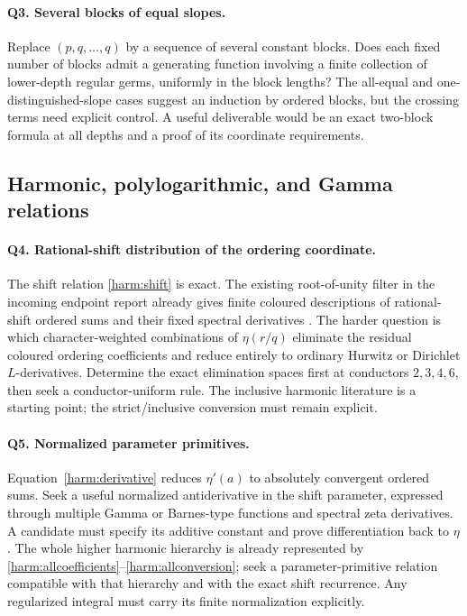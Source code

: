 \documentclass[11pt,letterpaper]{article}
\numberwithin{equation}{section}
\theoremstyle{definition}
\theoremstyle{remark}
\begin{document}
\paragraph{Q3. Several blocks of equal slopes.}
Replace $(p,q,\ldots,q)$ by a sequence of several constant blocks.
Does each fixed number of blocks admit a generating function involving
a finite collection of lower-depth regular germs, uniformly in the
block lengths? The all-equal and one-distinguished-slope cases suggest
an induction by ordered blocks, but the crossing terms need explicit
control. A useful deliverable would be an exact two-block formula at
all depths and a proof of its coordinate requirements.

\subsection{Harmonic, polylogarithmic, and Gamma relations}

\paragraph{Q4. Rational-shift distribution of the ordering coordinate.}
The shift relation \eqref{harm:shift} is exact. The existing
root-of-unity filter in the incoming endpoint report already gives
finite coloured descriptions of rational-shift ordered sums and
their fixed spectral derivatives \cite{repoendpoint}. The harder
question is which character-weighted combinations of $\eta(r/q)$
eliminate the residual coloured ordering coefficients and reduce
entirely to ordinary Hurwitz or Dirichlet $L$-derivatives. Determine
the exact elimination spaces first at conductors $2,3,4,6$, then
seek a conductor-uniform rule. The inclusive harmonic literature
\cite{Kargin} is a starting point; the strict/inclusive conversion
must remain explicit.

\paragraph{Q5. Normalized parameter primitives.}
Equation~\eqref{harm:derivative} reduces $\eta'(a)$ to absolutely
convergent ordered sums. Seek a useful normalized antiderivative in
the shift parameter, expressed through multiple Gamma or Barnes-type
functions and spectral zeta derivatives. A candidate must specify
its additive constant and prove differentiation back to $\eta$.
The whole higher harmonic hierarchy is already represented by
\eqref{harm:allcoefficients}--\eqref{harm:allconversion}; seek a
parameter-primitive relation compatible with that hierarchy and with
the exact shift recurrence. Any regularized integral must carry its
finite normalization explicitly.
\end{document}
